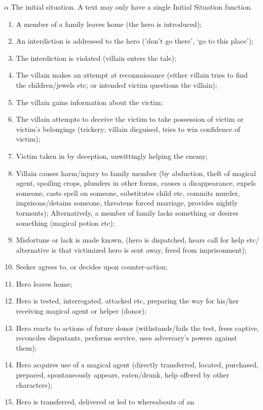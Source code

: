 \documentclass[10pt,a4paper]{article}
\begin{document}
	 $\alpha$ The initial situation. A text may only have a single Initial Situation function. 

\begin{enumerate}

	\item  A member of a family leaves home (the hero is introduced);
 	\item  An interdiction is addressed to the hero (’don’t go there’, ‘go to
this place’);
	\item  The interdiction is violated (villain enters the tale);
	\item  The villain makes an attempt at reconnaissance (either villain
tries to find the children/jewels etc; or intended victim questions
the villain);
 	\item  The villain gains information about the victim;
 	\item  The villain attempts to deceive the victim to take possession of
victim or victim’s belongings (trickery; villain disguised, tries to win
confidence of victim);
 	\item  Victim taken in by deception, unwittingly helping the enemy;
 	\item  Villain causes harm/injury to family member (by abduction,
theft of magical agent, spoiling crops, plunders in other forms,
causes a disappearance, expels someone, casts spell on someone,
substitutes child etc, commits murder, imprisons/detains someone,
threatens forced marriage, provides nightly torments); Alternatively,
a member of family lacks something or desires something (magical
potion etc);
 	\item  Misfortune or lack is made known, (hero is dispatched, hears
call for help etc/ alternative is that victimized hero is sent away,
freed from imprisonment);
 	\item  Seeker agrees to, or decides upon counter-action;
	\item  Hero leaves home;
 	\item  Hero is tested, interrogated, attacked etc, preparing the way
for his/her receiving magical agent or helper (donor);
 	\item  Hero reacts to actions of future donor (withstands/fails the
test, frees captive, reconciles disputants, performs service, uses
adversary’s powers against them);
 \item  Hero acquires use of a magical agent (directly transferred,
located, purchased, prepared, spontaneously appears, eaten/drunk,
help offered by other characters);
 \item  Hero is transferred, delivered or led to whereabouts of an

\end{enumerate}
\end{document}
